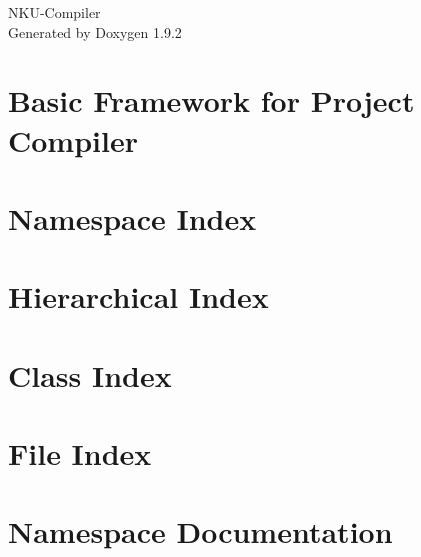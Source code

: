 \documentclass[twoside]{book}
\newcommand{\+}{\discretionary{\mbox{\scriptsize$\hookleftarrow$}}{}{}}
\newcommand{\clearemptydoublepage}{%
    \newpage{\pagestyle{empty}\cleardoublepage}%
  }
\begin{document}
  \raggedbottom
    \hypersetup{pageanchor=false,
                bookmarksnumbered=true,
                pdfencoding=unicode
               }
  \begin{titlepage}
  \vspace*{7cm}
  \begin{center}%
  {\Large NKU-\/\+Compiler}\\
  \vspace*{1cm}
  {\large Generated by Doxygen 1.9.2}\\
  \end{center}
  \end{titlepage}
  \clearemptydoublepage
  \tableofcontents
  \clearemptydoublepage
  \hypersetup{pageanchor=true}
\chapter{Basic Framework for Project Compiler}
\label{md__r_e_a_d_m_e}

\chapter{Namespace Index}

\chapter{Hierarchical Index}

\chapter{Class Index}

\chapter{File Index}

\chapter{Namespace Documentation}






\end{document}
